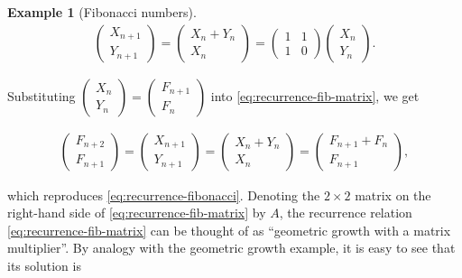 \documentclass[11pt]{report}
\theoremstyle{plain}
\theoremstyle{definition}
\newtheorem{example}[thm]{Example}
\begin{document}
\begin{example}[Fibonacci numbers]
\begin{equation*} \tag{33}\label{eq:recurrence-fib-matrix}
\begin{split}
\left( \begin{array}{c}X_{n+1}\\Y_{n+1}\end{array}\right) =
\left( \begin{array}{c} X_n+Y_n \\ X_n
\end{array}\right) =
\left( \begin{array}{cc}
1&1\\1&0
\end{array}\right)
\left( \begin{array}{c}X_n\\Y_n\end{array}\right).
\end{split}
\end{equation*}

\noindent Substituting
$\left(
\begin{array}{c}X_n\\Y_n\end{array}\right)=\left(
\begin{array}{c}F_{n+1}\\F_n\end{array}\right)$
into \eqref{eq:recurrence-fib-matrix}, we get

\begin{align*}
\left( \begin{array}{c}F_{n+2}\\F_{n+1}\end{array}\right)
=
\left( \begin{array}{c} X_{n+1}\\ Y_{n+1}
\end{array}\right) =
\left( \begin{array}{c} X_n+Y_n \\ X_n
\end{array}\right) =
\left( \begin{array}{c} F_{n+1}+F_n \\ F_{n+1}
\end{array}\right),
\end{align*}

\noindent which reproduces \eqref{eq:recurrence-fibonacci}. Denoting
the $2\times 2$ matrix on the right-hand side of
\eqref{eq:recurrence-fib-matrix} by $A$, the recurrence
relation \eqref{eq:recurrence-fib-matrix} can be thought
of as ``geometric growth with a matrix multiplier''.
By analogy with the geometric growth example, it is
easy to see that its solution is


\end{example}
\end{document}
